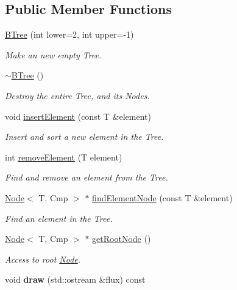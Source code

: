 \subsection*{Public Member Functions}
\begin{DoxyCompactItemize}
\item 
\hyperlink{classBTree_a83e51e388096d95b5521e8058bad44ed}{BTree} (int lower=2, int upper=-\/1)
\begin{DoxyCompactList}\small\item\em Make an new empty Tree. \item\end{DoxyCompactList}\item 
\hypertarget{classBTree_a2de4cbb350239a4af75aa7013a6a4d81}{
\hyperlink{classBTree_a2de4cbb350239a4af75aa7013a6a4d81}{$\sim$BTree} ()}
\label{classBTree_a2de4cbb350239a4af75aa7013a6a4d81}

\begin{DoxyCompactList}\small\item\em Destroy the entire Tree, and its Nodes. \item\end{DoxyCompactList}\item 
void \hyperlink{classBTree_aad8382a0461d68609f4a7ac6ff129b13}{insertElement} (const T \&element)
\begin{DoxyCompactList}\small\item\em Insert and sort a new element in the Tree. \item\end{DoxyCompactList}\item 
int \hyperlink{classBTree_a4a16f1104c087b066c112fb3d9bd9d67}{removeElement} (T element)
\begin{DoxyCompactList}\small\item\em Find and remove an element from the Tree. \item\end{DoxyCompactList}\item 
\hyperlink{classNode}{Node}$<$ T, Cmp $>$ $\ast$ \hyperlink{classBTree_af33992c6615d26590eec8c9c4f3a84de}{findElementNode} (const T \&element)
\begin{DoxyCompactList}\small\item\em Find an element in the Tree. \item\end{DoxyCompactList}\item 
\hyperlink{classNode}{Node}$<$ T, Cmp $>$ $\ast$ \hyperlink{classBTree_a3d649eb521392e1a6172e08ddd965a1b}{getRootNode} ()
\begin{DoxyCompactList}\small\item\em Access to root \hyperlink{classNode}{Node}. \item\end{DoxyCompactList}\item 
\hypertarget{classBTree_afd84bd36b0ac7b91c578b08cb5bf364c}{
void {\bfseries draw} (std::ostream \&flux) const }
\label{classBTree_afd84bd36b0ac7b91c578b08cb5bf364c}


\end{DoxyCompactItemize}
